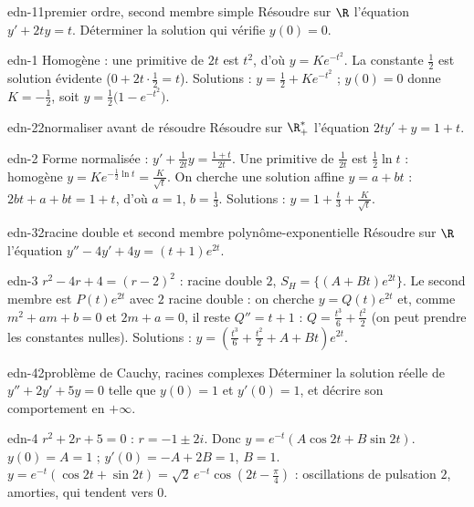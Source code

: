
\begin{exo}{edn-1}{1}{premier ordre, second membre simple}
Résoudre sur $\R$ l'équation $y'+2ty=t$. Déterminer la solution qui vérifie $y(0)=0$.
\end{exo}
\begin{corrige}{edn-1}
Homogène : une primitive de $2t$ est $t^2$, d'où $y=Ke^{-t^2}$. La constante $\frac12$ est solution évidente ($0+2t\cdot\frac12=t$).
Solutions : $y=\frac12+Ke^{-t^2}$ ; $y(0)=0$ donne $K=-\frac12$, soit $y=\frac12\big(1-e^{-t^2}\big)$.
\end{corrige}

\begin{exo}{edn-2}{2}{normaliser avant de résoudre}
Résoudre sur $\R_+^*$ l'équation $2ty'+y=1+t$.
\end{exo}
\begin{corrige}{edn-2}
Forme normalisée : $y'+\frac1{2t}y=\frac{1+t}{2t}$. Une primitive de $\frac1{2t}$ est $\frac12\ln t$ : homogène $y=Ke^{-\frac12\ln t}=\frac K{\sqrt t}$.
On cherche une solution affine $y=a+bt$ : $2bt+a+bt=1+t$, d'où $a=1$, $b=\frac13$. Solutions : $y=1+\frac t3+\frac K{\sqrt t}$.
\end{corrige}

\begin{exo}{edn-3}{2}{racine double et second membre polynôme-exponentielle}
Résoudre sur $\R$ l'équation $y''-4y'+4y=(t+1)e^{2t}$.
\end{exo}
\begin{corrige}{edn-3}
$r^2-4r+4=(r-2)^2$ : racine double $2$, $S_H=\{(A+Bt)e^{2t}\}$. Le second membre est $P(t)e^{2t}$ avec $2$ racine double :
on cherche $y=Q(t)e^{2t}$ et, comme $m^2+am+b=0$ et $2m+a=0$, il reste $Q''=t+1$ : $Q=\frac{t^3}6+\frac{t^2}2$ (on peut prendre
les constantes nulles). Solutions : $y=\left(\frac{t^3}6+\frac{t^2}2+A+Bt\right)e^{2t}$.
\end{corrige}

\begin{exo}{edn-4}{2}{problème de Cauchy, racines complexes}
Déterminer la solution réelle de $y''+2y'+5y=0$ telle que $y(0)=1$ et $y'(0)=1$, et décrire son comportement en $+\infty$.
\end{exo}
\begin{corrige}{edn-4}
$r^2+2r+5=0$ : $r=-1\pm2i$. Donc $y=e^{-t}(A\cos2t+B\sin2t)$. $y(0)=A=1$ ; $y'(0)=-A+2B=1$, $B=1$.
$y=e^{-t}(\cos2t+\sin2t)=\sqrt2\,e^{-t}\cos\left(2t-\frac\pi4\right)$ : oscillations de pulsation $2$, amorties, qui tendent vers $0$.
\end{corrige}

